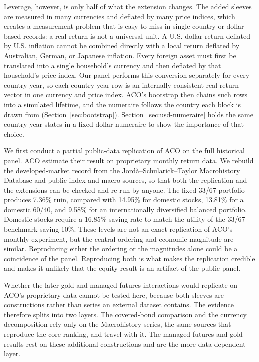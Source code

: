 \documentclass[11pt]{article}
\begin{document}
Leverage, however, is only half of what the extension changes. The added
sleeves are measured in many currencies and deflated by many price indices,
which creates a measurement problem that is easy to miss in single-country or
dollar-based records: a real return is not a universal unit. A U.S.-dollar
return deflated by U.S. inflation
cannot be combined directly with a local return deflated by Australian,
German, or Japanese inflation. Every foreign asset must first be translated
into a single household's currency and then deflated by that household's price
index. Our panel performs this conversion separately for every country-year, so
each country-year row is an internally consistent real-return vector in one
currency and price index. ACO's bootstrap then chains such rows into a
simulated lifetime, and the numeraire follows the country each block is drawn
from (Section~\ref{sec:bootstrap}). Section~\ref{sec:usd-numeraire} holds the
same country-year states in a fixed dollar numeraire to show the importance of
that choice.

We first conduct a partial public-data replication of ACO on the full historical
panel. ACO estimate their result on proprietary monthly return data. We rebuild
the developed-market record from the Jord{\`a}--Schularick--Taylor Macrohistory
Database and public index and macro sources, so that both the replication and
the extensions can be checked and re-run by anyone. The fixed 33/67 portfolio
produces 7.36\% ruin, compared with 14.95\% for domestic stocks, 13.81\% for a
domestic 60/40, and 9.58\% for an internationally diversified balanced
portfolio. Domestic stocks require a 16.85\% saving rate to match the utility of
the 33/67 benchmark saving 10\%. These levels are not an exact replication of
ACO's monthly experiment, but the central ordering and economic magnitude are
similar. Reproducing either the ordering or the magnitudes alone could be a coincidence
of the panel. Reproducing both is what makes the replication credible and makes
it unlikely that the equity result is an artifact of the public panel.

Whether the later gold and managed-futures interactions would replicate on
ACO's proprietary data cannot be tested here, because both sleeves are
constructions rather than series an external dataset contains. The evidence
therefore splits into two layers. The covered-bond comparison and the currency
decomposition rely only on the Macrohistory series, the same sources that
reproduce the core ranking, and travel with it. The managed-futures and gold
results rest on these additional constructions and are the more
data-dependent layer.
\end{document}
